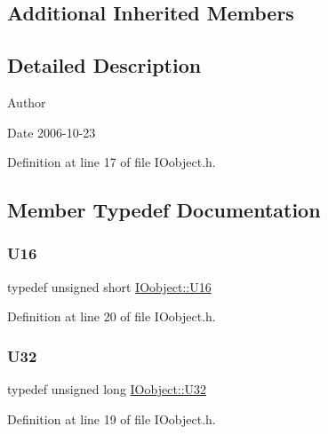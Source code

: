 \subsection*{Additional Inherited Members}


\subsection{Detailed Description}
\begin{DoxyAuthor}{Author}

\end{DoxyAuthor}
\begin{DoxyDate}{Date}
2006-\/10-\/23 
\end{DoxyDate}


Definition at line 17 of file I\+Oobject.\+h.



\subsection{Member Typedef Documentation}
\mbox{\label{classIOobject_a260583f7e496b1979cb75adc9bbb7fc4}} 
\subsubsection{\texorpdfstring{U16}{U16}}
{\footnotesize\ttfamily typedef unsigned short \hyperlink{classIOobject_a260583f7e496b1979cb75adc9bbb7fc4}{I\+Oobject\+::\+U16}}



Definition at line 20 of file I\+Oobject.\+h.

\mbox{\label{classIOobject_ad5bc21e44080074fe1068dc83861a090}} 
\subsubsection{\texorpdfstring{U32}{U32}}
{\footnotesize\ttfamily typedef unsigned long \hyperlink{classIOobject_ad5bc21e44080074fe1068dc83861a090}{I\+Oobject\+::\+U32}}



Definition at line 19 of file I\+Oobject.\+h.

\mbox{\label{classIOobject_a14ca3894cb3b023d2a0b2d088fddfc90}} 

